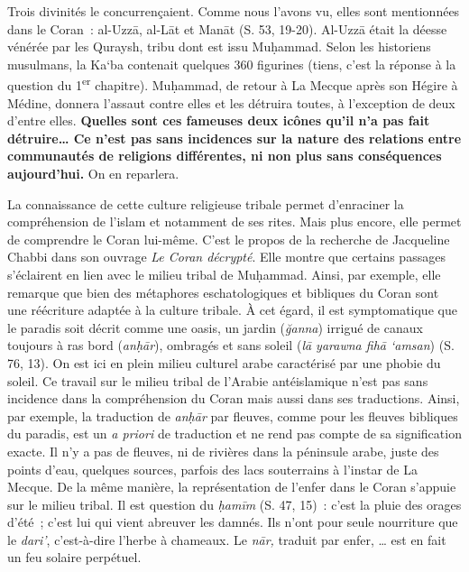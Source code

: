 Trois divinités le concurrençaient. Comme nous l'avons vu, elles sont
mentionnées dans le Coran~: al-Uzzā, al-Lāt et Manāt (S. 53, 19-20).
Al-Uzzā était la déesse vénérée par les Quraysh, tribu dont est issu
Muḥammad. Selon les historiens musulmans, la Ka`ba contenait quelques
360 figurines (tiens, c'est la réponse à la question du
1\textsuperscript{er} chapitre). Muḥammad, de retour à La Mecque après
son Hégire à Médine, donnera l'assaut contre elles et les détruira
toutes, à l'exception de deux d'entre elles. \textbf{Quelles sont ces
fameuses deux icônes qu'il n'a pas fait
détruire}\textbf{\ldots{}
Ce n'est pas sans incidences sur la nature des relations entre
communautés de religions différentes, ni non plus sans conséquences
aujourd'hui.} On en reparlera.

La connaissance de cette culture religieuse tribale permet d'enraciner
la compréhension de l'islam et notamment de ses rites. Mais plus encore,
elle permet de comprendre le Coran lui-même. C'est le propos de la
recherche de Jacqueline Chabbi dans son ouvrage \emph{Le Coran
décrypté}. Elle montre que certains passages s'éclairent en lien avec le
milieu tribal de Muḥammad. Ainsi, par exemple, elle remarque que bien
des métaphores eschatologiques et bibliques du Coran sont une réécriture
adaptée à la culture tribale. À cet égard, il est symptomatique que le
paradis soit décrit comme une oasis, un jardin (\emph{ğanna}) irrigué de
canaux toujours à ras bord (\emph{anḥār}), ombragés et sans soleil
(\emph{lā yarawna fihā `amsan}) (S. 76, 13). On est
ici en plein milieu culturel arabe caractérisé par une phobie du soleil.
Ce travail sur le milieu tribal de l'Arabie antéislamique n'est pas sans
incidence dans la compréhension du Coran mais aussi dans ses
traductions. Ainsi, par exemple, la traduction de \emph{anḥār} par
fleuves, comme pour les fleuves bibliques du paradis, est un \emph{a
priori} de traduction et ne rend pas compte de sa signification exacte.
Il n'y a pas de fleuves, ni de rivières dans la péninsule arabe, juste
des points d'eau, quelques sources, parfois des lacs souterrains à
l'instar de La Mecque. De la même manière, la représentation de l'enfer
dans le Coran s'appuie sur le milieu tribal. Il est question du
\emph{ḥamīm} (S. 47, 15)~: c'est la pluie des orages d'été~; c'est lui
qui vient abreuver les damnés. Ils n'ont pour seule nourriture que le
\emph{dari'}, c'est-à-dire l'herbe à chameaux. Le \emph{nār,} traduit
par enfer, \ldots{} est en fait un feu solaire perpétuel.

